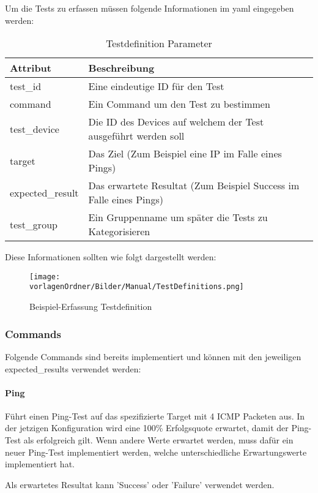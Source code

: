 \documentclass[]{subfiles}
\begin{document}
	Um die Tests zu erfassen müssen folgende Informationen im yaml eingegeben werden:

	\begin{table}
		\begin{tabularx}{\textwidth}{ll}
		\toprule
		Attribut & Beschreibung \\
		\midrule
		test\_id & Eine eindeutige ID für den Test \\
		command & Ein Command um den Test zu bestimmen \\
		test\_device & Die ID des Devices auf welchem der Test ausgeführt werden soll\\
		target & Das Ziel (Zum Beispiel eine IP im Falle eines Pings)\\
		expected\_result & Das erwartete Resultat (Zum Beispiel Success im Falle eines Pings)\\
		test\_group & Ein Gruppenname um später die Tests zu Kategorisieren\\
		\midrule
		\end{tabularx}
		\caption{Testdefinition Parameter}
	\end{table}
	

	Diese Informationen sollten wie folgt dargestellt werden: 

	\begin{figure}[h!]
		\begin{center}
			\texttt{[image: \\vorlagenOrdner/Bilder/Manual/TestDefinitions.png]}
			\caption{Beispiel-Erfassung Testdefinition}
		\end{center}
	\end{figure}
	\newpage

	\subsubsection{Commands}
		Folgende Commands sind bereits implementiert und können mit den jeweiligen expected\_results verwendet werden:
		\paragraph*{Ping}
			Führt einen Ping-Test auf das spezifizierte Target mit 4 ICMP Packeten aus.
			In der jetzigen Konfiguration wird eine 100\% Erfolgsquote erwartet, 
			damit der Ping-Test als erfolgreich gilt.
			Wenn andere Werte erwartet werden, muss dafür ein neuer Ping-Test implementiert
			werden, welche unterschiedliche Erwartungswerte implementiert hat.

			Als erwartetes Resultat kann 'Success' oder 'Failure' verwendet werden.
\end{document}
